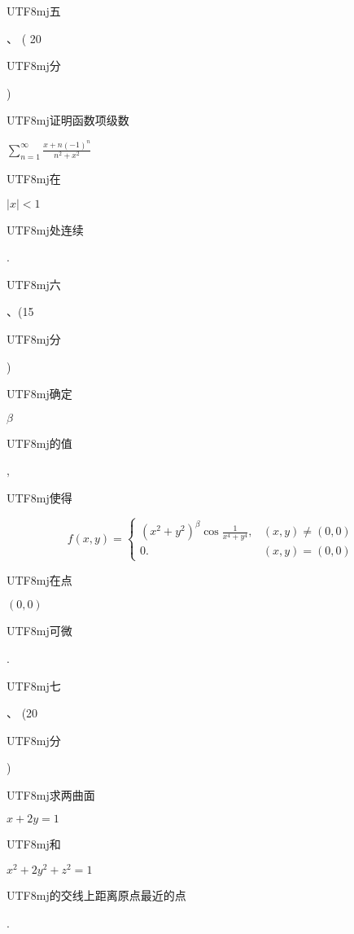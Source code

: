 \documentclass[10pt]{article}
\begin{document}
\begin{CJK}{UTF8}{mj}五\end{CJK}、 ( 20 \begin{CJK}{UTF8}{mj}分\end{CJK}) \begin{CJK}{UTF8}{mj}证明函数项级数\end{CJK} $\sum_{n=1}^{\infty} \frac{x+n(-1)^{n}}{n^{2}+x^{2}}$ \begin{CJK}{UTF8}{mj}在\end{CJK} $|x|<1$ \begin{CJK}{UTF8}{mj}处连续\end{CJK}.

\begin{CJK}{UTF8}{mj}六\end{CJK}、(15 \begin{CJK}{UTF8}{mj}分\end{CJK}) \begin{CJK}{UTF8}{mj}确定\end{CJK} $\beta$ \begin{CJK}{UTF8}{mj}的值\end{CJK}, \begin{CJK}{UTF8}{mj}使得\end{CJK}
$$
f(x, y)= \begin{cases}\left(x^{2}+y^{2}\right)^{\beta} \cos \frac{1}{x^{4}+y^{4}}, & (x, y) \neq(0,0) \\ 0 . & (x, y)=(0,0)\end{cases}
$$
\begin{CJK}{UTF8}{mj}在点\end{CJK} $(0,0)$ \begin{CJK}{UTF8}{mj}可微\end{CJK}.

\begin{CJK}{UTF8}{mj}七\end{CJK}、 (20 \begin{CJK}{UTF8}{mj}分\end{CJK}) \begin{CJK}{UTF8}{mj}求两曲面\end{CJK} $x+2 y=1$ \begin{CJK}{UTF8}{mj}和\end{CJK} $x^{2}+2 y^{2}+z^{2}=1$ \begin{CJK}{UTF8}{mj}的交线上距离原点最近的点\end{CJK}.
\end{document}
